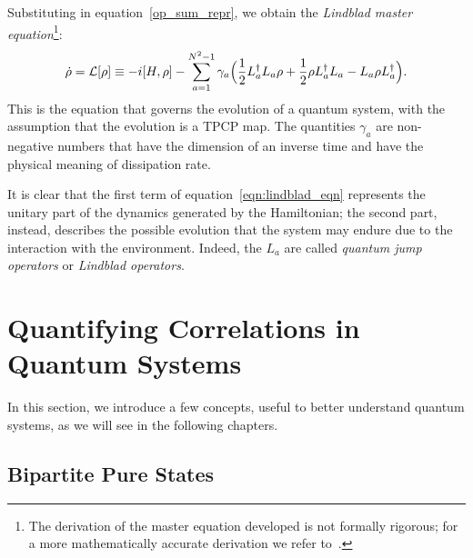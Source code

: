Substituting in equation~\ref{op_sum_repr}, we obtain the \emph{Lindblad master equation}\footnote{The derivation of the master equation developed is not formally rigorous; for a more mathematically accurate derivation we refer to~\cite{pet_breuer:open_quantum}.}:
\begin{equation}
\label{eqn:lindblad_eqn}
    \dot{\rho} = \mathcal{L}[\rho] \equiv -i[H, \rho] - \sum_{a=1}^{N^2-1} \gamma_a \Bigl(\frac{1}{2}L_a^{\dagger}L_a\rho + \frac{1}{2}\rho L_a^{\dagger}L_a - L_a\rho L_a^{\dagger}\Bigl).
\end{equation}
This is the equation that governs the evolution of a quantum system, with the assumption that the evolution is a TPCP map. The quantities $\gamma_a$ are non-negative numbers that have the dimension of an inverse time and have the physical meaning of dissipation rate.

It is clear that the first term of equation~\ref{eqn:lindblad_eqn} represents the unitary part of the dynamics generated by the Hamiltonian; the second part, instead, describes the possible evolution that the system may endure due to the interaction with the environment. Indeed, the $L_a$ are called \emph{quantum jump operators} or \emph{Lindblad operators}.



\section{Quantifying Correlations in Quantum Systems}
\label{many_body_oqs}
In this section, we introduce a few concepts, useful to better understand quantum systems, as we will see in the following chapters.

\subsection{Bipartite Pure States}

